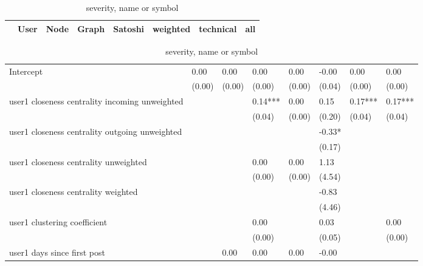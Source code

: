 \begin{table}
\caption{severity, name or symbol}
\begin{center}
\begin{tabular}{lccccccc}
\hline
                                               &   User  &   Node  &  Graph  & Satoshi &   weighted  & technical &   all    \\
\hline
\hline
\end{tabular}
\begin{tabular}{llllllll}
Intercept                                      & 0.00    & 0.00    & 0.00    & 0.00    & -0.00       & 0.00      & 0.00     \\
                                               & (0.00)  & (0.00)  & (0.00)  & (0.00)  & (0.04)      & (0.00)    & (0.00)   \\
user1 closeness centrality incoming unweighted &         &         & 0.14*** & 0.00    & 0.15        & 0.17***   & 0.17***  \\
                                               &         &         & (0.04)  & (0.00)  & (0.20)      & (0.04)    & (0.04)   \\
user1 closeness centrality outgoing unweighted &         &         &         &         & -0.33*      &           &          \\
                                               &         &         &         &         & (0.17)      &           &          \\
user1 closeness centrality unweighted          &         &         & 0.00    & 0.00    & 1.13        &           &          \\
                                               &         &         & (0.00)  & (0.00)  & (4.54)      &           &          \\
user1 closeness centrality weighted            &         &         &         &         & -0.83       &           &          \\
                                               &         &         &         &         & (4.46)      &           &          \\
user1 clustering coefficient                   &         &         & 0.00    &         & 0.03        &           & 0.00     \\
                                               &         &         & (0.00)  &         & (0.05)      &           & (0.00)   \\
user1 days since first post                    &         & 0.00    & 0.00    & 0.00    & -0.00       &           &          \\

\end{tabular}
\end{center}
\end{table}
